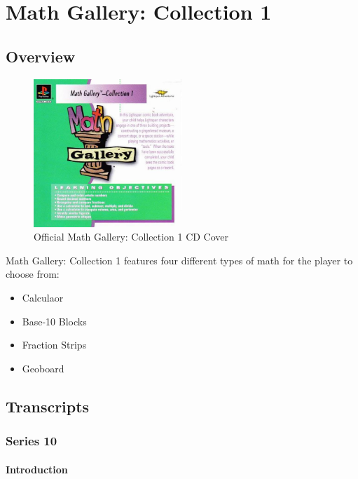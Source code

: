 \chapter{Math Gallery: Collection 1}

\section{Overview}

\begin{figure}[H]
    \centering
    \includegraphics[width=0.5\textwidth]{Games/MathGalleryCollection/Images/MathGalleryCollection1Cover.jpg}
    \caption{Official Math Gallery: Collection 1 CD Cover}
\end{figure}

Math Gallery: Collection 1 features four different types of math for the player to choose from:

\begin{itemize}
    \item Calculaor
    \item Base-10 Blocks
    \item Fraction Strips
    \item Geoboard
\end{itemize}

\section{Transcripts}

\subsection{Series 10}

\subsubsection{Introduction}

